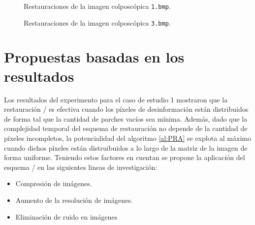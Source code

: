 \begin{figure}[H]
	\centering
	\caption{Restauraciones de la imagen colposc\'opica \texttt{1.bmp}.}
	\label{fig:1.bmp}
\end{figure}

\begin{figure}[H]
	\centering
	\caption{Restauraciones de la imagen colposc\'opica \texttt{3.bmp}.}
	\label{fig:3.bmp}
\end{figure}

\section{Propuestas basadas en los resultados}\label{sec:suggestions}

Los resultados del experimento para el caso de estudio 1 mostraron que la restauraci\'on \SOP/ es efectiva cuando los p\'ixeles de desinformaci\'on est\'an distribuidos de forma tal que la cantidad de parches vac\'ios sea m\'inima. Adem\'as, dado que la complejidad temporal del esquema de restauraci\'on no depende de la cantidad de p\'ixeles incompletos, la potencialidad del algoritmo \ref{al:PRA} se explota al m\'aximo cuando dichos p\'ixeles están distruibuidos a lo largo de la matriz de la imagen de forma uniforme. Teniendo estos factores en cuentan se propone la aplicaci\'on del esquema \SOP/ en las siguientes lineas de investigaci\'on:
\begin{itemize}
	\item Compresi\'on de im\'agenes.
	\item Aumento de la resoluci\'on de im\'agenes.
	\item Eliminaci\'on de ruido en im\'agenes 
\end{itemize}

